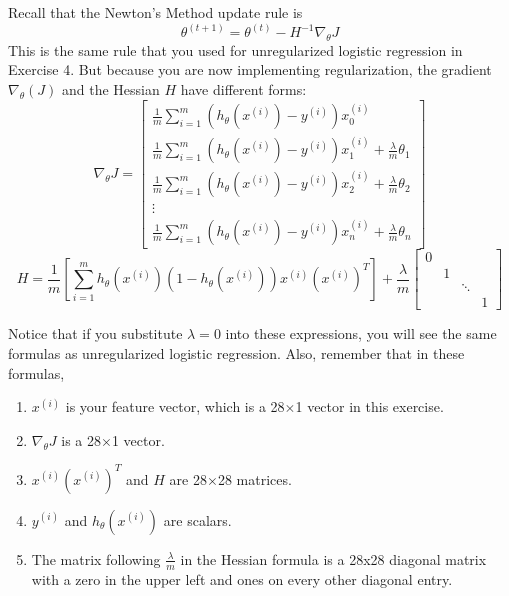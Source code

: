 \documentclass[10pt,a4paper]{article}
\begin{document}
  Recall that the Newton's Method update rule is 
  \begin{displaymath}
    \theta^{(t+1)}=\theta^{(t)}-H^{-1}\nabla_{\theta}J \nonumber
  \end{displaymath}
  This is the same rule that you used for unregularized logistic regression in Exercise 4. But because you are now implementing regularization, the gradient  $\nabla_{\theta}(J)$ and the Hessian $H$ have different forms: 
  \begin{equation}
    \nabla_\theta J = \begin{bmatrix}
      \frac{1}{m} \sum^m_{i=1} \left( h_\theta(x^{(i)}) - y^{(i)} \right) x^{(i)}_0 \\
      \frac{1}{m} \sum^m_{i=1} \left( h_\theta(x^{(i)}) - y^{(i)} \right) x^{(i)}_1 + \frac{\lambda}{m} \theta_1 \\
      \frac{1}{m} \sum^m_{i=1} \left( h_\theta(x^{(i)}) - y^{(i)} \right) x^{(i)}_2 + \frac{\lambda}{m} \theta_2 \\
      \vdots \\
      \frac{1}{m} \sum^m_{i=1} \left( h_\theta(x^{(i)}) - y^{(i)} \right) x^{(i)}_n + \frac{\lambda}{m} \theta_n
    \end{bmatrix}
  \end{equation}
  \begin{equation}
    H = \frac{1}{m} \left[ \sum^m_{i=1} h_\theta(x^{(i)}) \left( 1 - h_\theta(x^{(i)}) \right) x^{(i)} \left(x^{(i)}\right)^T  \right] + \frac{\lambda}{m} 
    \begin{bmatrix} 
      0 & & &  \\
      & 1 & &  \\
      & & \ddots & \\
      & & & 1 
    \end{bmatrix}
  \end{equation}



  Notice that if you substitute $\lambda = 0$ into these expressions, you will see the same formulas as unregularized logistic regression. Also, remember that in these formulas,
  \begin{enumerate}
    \item $x^{(i)}$ is your feature vector, which is a 28$\times$1 vector in this exercise.
    \item $\nabla_{\theta}J$ is a 28$\times$1 vector.
    \item $x^{(i)}(x^{(i)})^T$ and $H$ are 28$\times$28 matrices.
    \item $y^{(i)}$ and  $h_\theta(x^{(i)})$ are scalars.
    \item The matrix following  $\frac{\lambda}{m}$ in the Hessian formula is a 28x28 diagonal matrix with a zero in the upper left and ones on every other diagonal entry.
  \end{enumerate}
\end{document}
